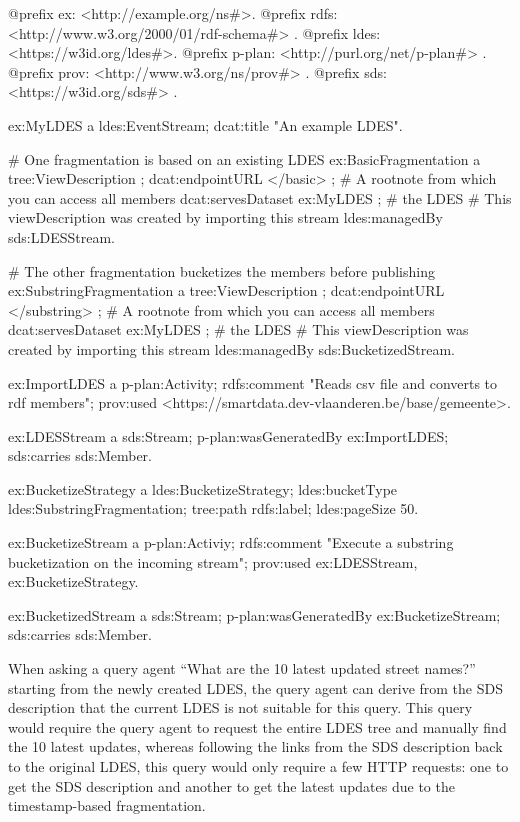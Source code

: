 \begin{lstlistingsp}[language=ttl,caption={RDF sample creating two LDES Views from different Streams},label={lst:sds-example},basicstyle=\ttfamily\scriptsize]
@prefix ex:     <http://example.org/ns#>.
@prefix rdfs:   <http://www.w3.org/2000/01/rdf-schema#> .
@prefix ldes:   <https://w3id.org/ldes#>.
@prefix p-plan: <http://purl.org/net/p-plan#> .
@prefix prov:   <http://www.w3.org/ns/prov#> .
@prefix sds:    <https://w3id.org/sds#> .

ex:MyLDES a ldes:EventStream;
  dcat:title "An example LDES".

# One fragmentation is based on an existing LDES
ex:BasicFragmentation a tree:ViewDescription ;
  dcat:endpointURL </basic> ; # A rootnote from which you can access all members
  dcat:servesDataset ex:MyLDES ; # the LDES
  # This viewDescription was created by importing this stream
  ldes:managedBy sds:LDESStream.

# The other fragmentation bucketizes the members before publishing
ex:SubstringFragmentation a tree:ViewDescription ;
  dcat:endpointURL </substring> ; # A rootnote from which you can access all members
  dcat:servesDataset ex:MyLDES ; # the LDES
  # This viewDescription was created by importing this stream
  ldes:managedBy sds:BucketizedStream.


ex:ImportLDES a p-plan:Activity;
  rdfs:comment "Reads csv file and converts to rdf members";
  prov:used <https://smartdata.dev-vlaanderen.be/base/gemeente>.

ex:LDESStream a sds:Stream;
  p-plan:wasGeneratedBy ex:ImportLDES;
  sds:carries sds:Member.


ex:BucketizeStrategy a ldes:BucketizeStrategy;
    ldes:bucketType ldes:SubstringFragmentation;
    tree:path rdfs:label;
    ldes:pageSize 50.

ex:BucketizeStream a p-plan:Activiy;
  rdfs:comment "Execute a substring bucketization on the incoming stream";
  prov:used ex:LDESStream, ex:BucketizeStrategy.

ex:BucketizedStream a sds:Stream;
  p-plan:wasGeneratedBy ex:BucketizeStream;
  sds:carries sds:Member.
\end{lstlistingsp}

When asking a query agent ``What are the 10 latest updated street names?''
starting from the newly created LDES, the query agent can derive from the
SDS description that the current LDES is not suitable for this query. This
query would require the query agent to request the entire LDES tree and
manually find the 10 latest updates, whereas following the links from the
SDS description back to the original LDES, this query would only require a
few HTTP requests: one to get the SDS description and another to get the
latest updates due to the timestamp-based fragmentation.

